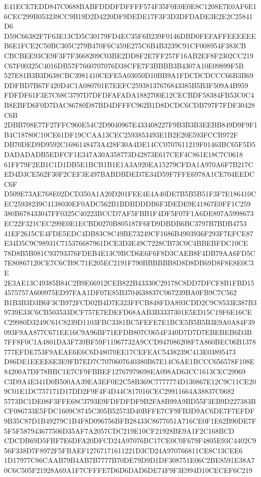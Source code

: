 \documentclass[UTF8,fontset=fandol,zihao=-4,a4paper]{ctexart}
\begin{document}
{{E41ECE7EDD847C0688BABFDDDFDFFFF574F35F0E0E0E8C1208E7E0AF6E16CEC299B053239CC9B19D2D4220DF9DEDE17F3F3D3DFDADE3E2E2C25841D6
D59C66382F7F63E13CD5C30179FD4EC35F6B239F0146DBD0FEFAFFEEEEEEB6E1FCE2C50BC305C279B470F6C459E275C6B4B3239C91CF008954F383CB
CBCBEE93CE9F3F7F3668209C03BE2DD8F2E7FF257F16AB2EF8F2302CC219C67F00325C4016DB57F7660707076D38CFE7F3BBBB3B4307A10E09899F5B
527E81B3B3D638CBC3981410CEFE5A03050D10BB9A1FDCDCDCCC66B3B69DDFBD7B67F420D4C1A080701E7EEFC25938137676843385B5B3F509A4B959
FDFDF61F3E7C68C3797D7DFDFAFADA1882700E12CECBDF58384FB53C0C4B8EBFD6F0D7DAC86780D87BD4DFFFC962B1D8DCDC6CDB797F7FDF30428C6B
2DBB708E77F27FFC960E54C2D9040967E433408227F9B3B3B3EEBB849D9F9F1B4C18780C10CE61DF19CCAA13CEC2593853493E1B2E20E593FCCB972F
DB70DED9D9592C1686148473A428F30A4DE14CC0707611219F01463BC65F5D5DADADADB5EDFCF1E347A30A358773D42873E617CEF4C861E18C7C0618
61FF79F2EB1C1D1DB5E1BCB1B1E1A3A920EA15279CFDA1A970A6F7B217CED4D3CE562F30F2CEF3E497BABDBDED7E34D59F7FFE6978A1CE704EEDCC6F
D509E73AE768E02DCD350A1A20D201FEE4E4A40DE7B5B5B51F3F7E186410CEC25938239C4138030EF0ADC562B1BDBDDDB6F3DEDE9E41867E0FF1C259
380B678433047FF0325C40223BCCD7AF5FBB1F4DF5F07F1A6DE897A5998673EC22F321CEC299E0E1ECBD0270B805187F6FD9DBDB6BC3797B7BDB4753
41EF2615CE4FDE5EDC4DB83C8C49BE73249CF1686B4903936F293F7EFCE87E34D5C9C98931C715376687961DCE3D3E49C7228CB73C0C4BBEBFDC10CE
78D8B5B081C93793376FDEB4E13C9BCD6E6F6F8D3CAEB8F4DB79AA6FD5C7E80867120CE7C6CB9C71E205EC2191F790BBBBBB8D8D8DB69D8F8E8E0C3E
2E3AE13C49385B84C2B9E66912CEB822B43330C29178C8DD7DFCF8B1FBD154575757A600975ED97FAA1DF07E85B3704638837C067239BA0FB9C7C562
B1B3B3D3B6F3CB972FCD02B4D7E323FFCB848FDA893CDD2C9C8533E387B39739E33C6CB503533DCF757E7EDEFD68AAB3B3337301E5ED15C19F6E16CE
C29980D3249C61C8239D1103FBC3381BC5FEFE7E1BCE5B5B5B3E9A0A84F39093F9AA877C671EE16C9A96BF71EFDB807C0654F340D7D7D7EBEBEB6D3B
7FF8F0C1A4801DA3F739BF59F11967732A9CCD947086208F7A860BEC06B1378777EFDE753F9AEAE6E6C6D48070EE17CEFEAC5438239C413E03895473
D86DE1EEEE6E3E9FB7ED7C7070607640380B67E14C6AE1BCCC656578F108E84200A7DF78BBC1E7CF9FBBEF12767979698EA098AD63CC1613CEC29969
C3D9A4E341D0B500AA39EA3EF0E2C58B369C7777774D130867E12C9C11CE209C01E1DC757171D17DD2F9F4F4D44C817016CEC29911664A38837C0682
5773BC1DE08F3FFE68C3793E9FDFDFDF9B2FA8B99A9BD55F3EB9D227383BCF086733E5FDC1609C8745C305B52573D40BFFE7CF9FB3D9AC6DE7F7EFDF
9B35C87D1B49279C1B4F8D096756BFB28433C8677051A716CE0F1E62B90DE7F5F5F587943677506D35AF7A2057CDC219E10CF21928BE9A1F2C168BCD
CDCDB69D5FBF7E6DFA20DFCD24A97076BC17CE0C0F679F4805E93C4402C956F338D7F8972F5FBAEF12767171611221D3CD24A970766811CE8C13CEE6
1D17977C86CAAB79B4AB7B7777B70DE79D9D1DF308751E06C2BE8591E38A70C6C505F21928A69A1F7CFFFE7D6D6DAD6DE74F9F3E994D10CECEF6C219
}}
\end{document}
